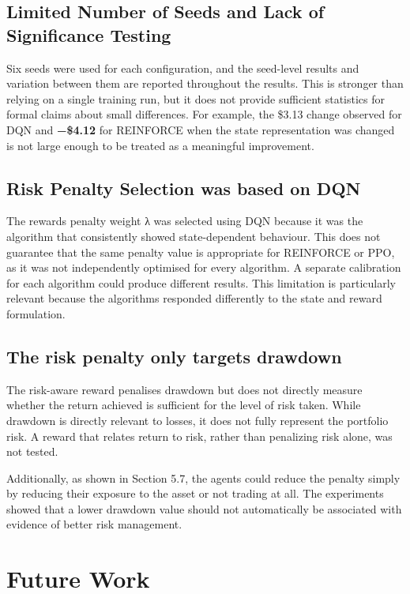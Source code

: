 \subsection{Limited Number of Seeds and Lack of Significance Testing}

Six seeds were used for each configuration, and the seed-level results
and variation between them are reported throughout the results. This is
stronger than relying on a single training run, but it does not provide
sufficient statistics for formal claims about small differences. For
example, the \$3.13 change observed for DQN and \textbf{−\$4.12} for
REINFORCE when the state representation was changed is not large enough
to be treated as a meaningful improvement.

\subsection{Risk Penalty Selection was based on DQN}

The reward\textquotesingle s penalty weight λ was selected using DQN
because it was the algorithm that consistently showed state-dependent
behaviour. This does not guarantee that the same penalty value is
appropriate for REINFORCE or PPO, as it was not independently optimised
for every algorithm. A separate calibration for each algorithm could
produce different results. This limitation is particularly relevant
because the algorithms responded differently to the state and reward
formulation.

\subsection{The risk penalty only targets drawdown}

The risk-aware reward penalises drawdown but does not directly measure
whether the return achieved is sufficient for the level of risk taken.
While drawdown is directly relevant to losses, it does not fully
represent the portfolio risk. A reward that relates return to risk,
rather than penalizing risk alone, was not tested.

Additionally, as shown in Section 5.7, the agents could reduce the
penalty simply by reducing their exposure to the asset or not trading at
all. The experiments showed that a lower drawdown value should not
automatically be associated with evidence of better risk management.

\section{Future Work}

